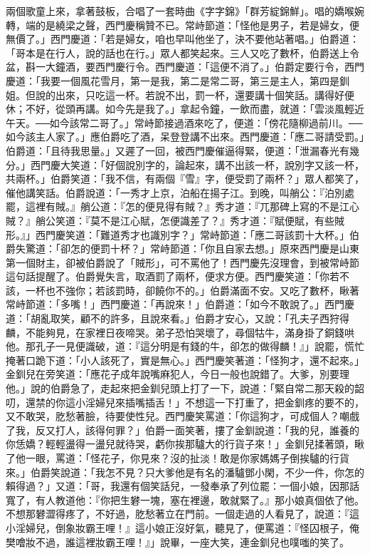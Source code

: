 兩個歌童上來，拿著鼓板，合唱了一套時曲《字字錦》「群芳綻錦鮮」。唱的嬌喉婉轉，端的是繞梁之聲，西門慶稱贊不已。常峙節道：「怪他是男子，若是婦女，便無價了。」西門慶道：「若是婦女，咱也早叫他坐了，決不要他站著唱。」伯爵道：「哥本是在行人，說的話也在行。」眾人都笑起來。三人又吃了數杯，伯爵送上令盆，斟一大鐘酒，要西門慶行令。西門慶道：「這便不消了。」伯爵定要行令，西門慶道：「我要一個風花雪月，第一是我，第二是常二哥，第三是主人，第四是釧姐。但說的出來，只吃這一杯。若說不出，罰一杯，還要講十個笑話。講得好便休；不好，從頭再講。如今先是我了。」拿起令鐘，一飲而盡，就道：「雲淡風輕近午天。──如今該常二哥了。」常峙節接過酒來吃了，便道：「傍花隨柳過前川。──如今該主人家了。」應伯爵吃了酒，呆登登講不出來。西門慶道：「應二哥請受罰。」伯爵道：「且待我思量。」又遲了一回，被西門慶催逼得緊，便道：「泄漏春光有幾分。」西門慶大笑道：「好個說別字的，論起來，講不出該一杯，說別字又該一杯，共兩杯。」伯爵笑道：「我不信，有兩個『雪』字，便受罰了兩杯？」眾人都笑了，催他講笑話。伯爵說道：「一秀才上京，泊船在揚子江。到晚，叫艄公：『泊別處罷，這裡有賊。』艄公道：『怎的便見得有賊？』秀才道：『兀那碑上寫的不是江心賊？』艄公笑道：『莫不是江心賦，怎便識差了？』秀才道：『賦便賦，有些賊形。』」西門慶笑道：「難道秀才也識別字？」常峙節道：「應二哥該罰十大杯。」伯爵失驚道：「卻怎的便罰十杯？」常峙節道：「你且自家去想。」原來西門慶是山東第一個財主，卻被伯爵說了「賊形」，可不罵他了！西門慶先沒理會，到被常峙節這句話提醒了。伯爵覺失言，取酒罰了兩杯，便求方便。西門慶笑道：「你若不該，一杯也不強你；若該罰時，卻饒你不的。」伯爵滿面不安。又吃了數杯，瞅著常峙節道：「多嘴！」西門慶道：「再說來！」伯爵道：「如今不敢說了。」西門慶道：「胡亂取笑，顧不的許多，且說來看。」伯爵才安心，又說：「孔夫子西狩得麟，不能夠見，在家裡日夜啼哭。弟子恐怕哭壞了，尋個牯牛，滿身掛了銅錢哄他。那孔子一見便識破，道：『這分明是有錢的牛，卻怎的做得麟！』」說罷，慌忙掩著口跪下道：「小人該死了，實是無心。」西門慶笑著道：「怪狗才，還不起來。」金釧兒在旁笑道：「應花子成年說嘴麻犯人，今日一般也說錯了。大爹，別要理他。」說的伯爵急了，走起來把金釧兒頭上打了一下，說道：「緊自常二那天殺的韶叨，還禁的你這小淫婦兒來插嘴插舌！」不想這一下打重了，把金釧疼的要不的，又不敢哭，肐愁著臉，待要使性兒。西門慶笑罵道：「你這狗才，可成個人？嘲戲了我，反又打人，該得何罪？」伯爵一面笑著，摟了金釧說道：「我的兒，誰養的你恁嬌？輕輕盪得一盪兒就待哭，虧你挨那驢大的行貨子來！」金釧兒揉著頭，瞅了他一眼，罵道：「怪花子，你見來？沒的扯淡！敢是你家媽媽子倒挨驢的行貨來。」伯爵笑說道：「我怎不見？只大爹他是有名的潘驢鄧小閑，不少一件，你怎的賴得過？」又道：「哥，我還有個笑話兒，一發奉承了列位罷：一個小娘，因那話寬了，有人教道他：『你把生礬一塊，塞在裡邊，敢就緊了。』那小娘真個依了他。不想那礬澀得疼了，不好過，肐愁著立在門前。一個走過的人看見了，說道：『這小淫婦兒，倒象妝霸王哩！』這小娘正沒好氣，聽見了，便罵道：『怪囚根子，俺樊噲妝不過，誰這裡妝霸王哩！』」說畢，一座大笑，連金釧兒也噗嗤的笑了。

